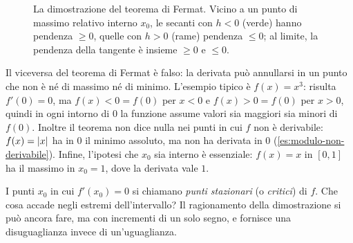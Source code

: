 \begin{figure}[htb]
\centering
{}
\caption{La dimostrazione del teorema di Fermat. Vicino a un punto di massimo relativo
interno $x_{0}$, le secanti con $h<0$ (verde) hanno pendenza $\ge0$, quelle con $h>0$
(rame) pendenza $\le0$; al limite, la pendenza della tangente è insieme $\ge0$ e $\le0$.}
\label{fig:fermat}
\end{figure}

\begin{attenzione}
Il viceversa del teorema di Fermat è falso: la derivata può annullarsi in un punto
che non è né di massimo né di minimo. L'esempio tipico è $f(x)=x^{3}$: risulta
$f'(0)=0$, ma $f(x)<0=f(0)$ per $x<0$ e $f(x)>0=f(0)$ per $x>0$, quindi in ogni intorno
di $0$ la funzione assume valori sia maggiori sia minori di $f(0)$. Inoltre il teorema
non dice nulla nei punti in cui $f$ non è derivabile: $f(x)=\lvert x\rvert$ ha in $0$ il minimo
assoluto, ma non ha derivata in $0$ (\cref{es:modulo-non-derivabile}). Infine, l'ipotesi
che $x_{0}$ sia interno è essenziale: $f(x)=x$ in $[0,1]$ ha il massimo in $x_{0}=1$,
dove la derivata vale $1$.
\end{attenzione}

I punti $x_{0}$ in cui $f'(x_{0})=0$ si chiamano \emph{punti stazionari} (o
\emph{critici}) di $f$. Che cosa accade negli estremi
dell'intervallo? Il ragionamento della dimostrazione si può ancora fare, ma con
incrementi di un solo segno, e fornisce una disuguaglianza invece di un'uguaglianza.


